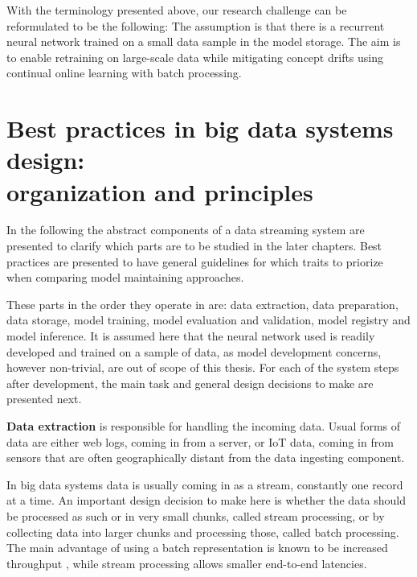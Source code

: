 With the terminology presented above, our research challenge can be reformulated to be the following: The assumption is that there is a recurrent neural network trained on a small data sample in the model storage. The aim is to enable retraining on large-scale data while mitigating concept drifts using continual online learning with batch processing. 



\section[Best practices in big data systems design: organization and principles]{Best practices in big data systems design:\\ organization and principles}

In the following the abstract components of a data streaming system are presented to clarify which parts are to be studied in the later chapters. Best practices are presented to have general guidelines for which traits to priorize when comparing model maintaining approaches.

These parts in the order they operate in are: data extraction, data preparation, data storage, model training, model evaluation and validation, model registry and model inference. It is assumed here that the neural network used is readily developed and trained on a sample of data, as model development concerns, however non-trivial, are out of scope of this thesis. For each of the system steps after development, the main task and general design decisions to make are presented next.

\textbf{Data extraction} is responsible for handling the incoming data. Usual forms of data are either web logs, coming in from a server, or IoT data, coming in from sensors that are often geographically distant from the data ingesting component.

In big data systems data is usually coming in as a stream, constantly one record at a time. An important design decision to make here is whether the data should be processed as such or in very small chunks, called stream processing, or by collecting data into  larger chunks and processing those, called batch processing. The main advantage of using a batch representation is known to be increased throughput%
, while stream processing allows smaller end-to-end latencies. %

